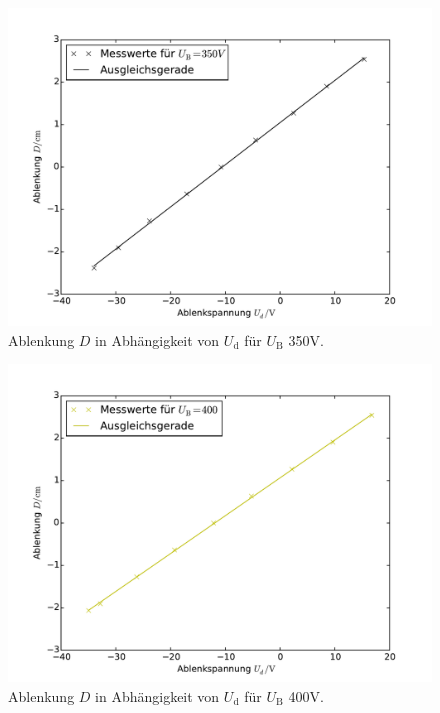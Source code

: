 \begin{figure}
  \centering
  \includegraphics[scale=0.8]{auswertung/501-a4.pdf}
\caption{Ablenkung $D$ in Abhängigkeit von $U_\mathrm{d}$ für $U_\mathrm{B}$ 350\si{\volt}.}
  \label{fig:empfindlichkeit4}
\end{figure}

\begin{figure}
  \centering
  \includegraphics[scale=0.8]{auswertung/501-a5.pdf}
\caption{Ablenkung $D$ in Abhängigkeit von $U_\mathrm{d}$ für $U_\mathrm{B}$ 400\si{\volt}.}
  \label{fig:empfindlichkeit5}
\end{figure}

